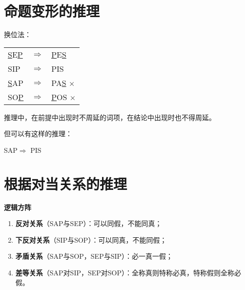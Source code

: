 \documentclass[12pt,onecolumn,a4paper]{book}
\numberwithin{table}{subsection}
\numberwithin{equation}{subsection}
\begin{document}
\section{命题变形的推理}

换位法：

\begin{center}
    \begin{tabular}{lll}
        \underline{S}E\underline{P}&$\Rightarrow$&\underline{P}E\underline{S}\\

        SIP&$\Rightarrow$&PIS\\

        \underline{S}AP &$\Rightarrow$& PA\underline{S} ×\\

        SO\underline{P}&$\Rightarrow$&\underline{P}OS ×\\
    \end{tabular}   
\end{center}

推理中，在前提中出现时不周延的词项，在结论中出现时也不得周延。

但可以有这样的推理：

\begin{center}
SAP$ \Rightarrow$ PIS
\end{center}

\section{根据对当关系的推理}

\textbf{逻辑方阵}
\begin{enumerate}[itemsep=0pt,parsep=0pt]
    \item \textbf{反对关系}（SAP与SEP）：可以同假，不能同真；
    \item \textbf{下反对关系}（SIP与SOP）：可以同真，不能同假；
    \item \textbf{矛盾关系}（SAP与SOP，SEP与SIP）：必一真一假；
    \item \textbf{差等关系}（SAP对SIP，SEP对SOP）：全称真则特称必真，特称假则全称必假。
\end{enumerate}
\end{document}
